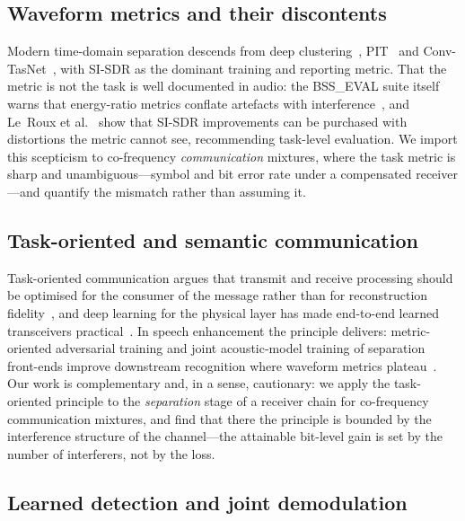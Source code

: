\documentclass[review,12pt]{elsarticle}
\begin{document}
\subsection{Waveform metrics and their discontents}

Modern time-domain separation descends from deep
clustering~\cite{hershey2016deep}, PIT~\cite{kolbaek2017pit} and
Conv-TasNet~\cite{luo2019conv}, with SI-SDR as the dominant training
and reporting metric. That the metric is not the task is well documented
in audio: the BSS\_EVAL suite itself warns that energy-ratio metrics
conflate artefacts with interference~\cite{vincent2006bsseval}, and
Le~Roux et al.~\cite{leroux2019sdr} show that SI-SDR improvements can
be purchased with distortions the metric cannot see, recommending
task-level evaluation. We import this scepticism to co-frequency
\emph{communication} mixtures, where the task metric is sharp and
unambiguous---symbol and bit error rate under a compensated
receiver---and quantify the mismatch rather than assuming it.

\subsection{Task-oriented and semantic communication}

Task-oriented communication argues that transmit and receive processing
should be optimised for the consumer of the message rather than for
reconstruction
fidelity~\cite{strinati2021semantic,gunduz2023beyond}, and deep learning
for the physical layer has made end-to-end learned transceivers
practical~\cite{oshea2017intro}. In speech enhancement the principle
delivers: metric-oriented adversarial training and joint acoustic-model
training of separation front-ends improve downstream recognition where
waveform metrics plateau~\cite{lo2019metricgan,ochiai2017multichannel}.
Our work is complementary and, in a sense, cautionary: we apply the
task-oriented principle to the \emph{separation} stage of a receiver
chain for co-frequency communication mixtures, and find that there the
principle is bounded by the interference structure of the channel---the
attainable bit-level gain is set by the number of interferers, not by
the loss.

\subsection{Learned detection and joint demodulation}
\end{document}
